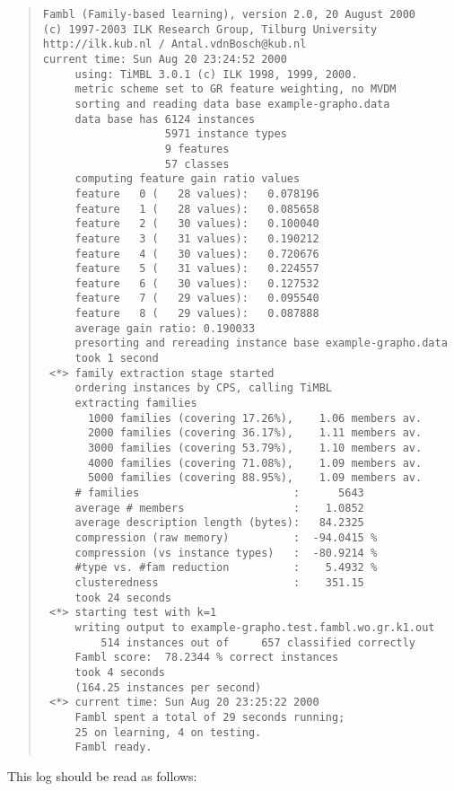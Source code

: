 \documentclass[11pt]{article}
\begin{document}
\begin{quote}
{\tiny
\begin{verbatim}
Fambl (Family-based learning), version 2.0, 20 August 2000
(c) 1997-2003 ILK Research Group, Tilburg University
http://ilk.kub.nl / Antal.vdnBosch@kub.nl
current time: Sun Aug 20 23:24:52 2000
     using: TiMBL 3.0.1 (c) ILK 1998, 1999, 2000.
     metric scheme set to GR feature weighting, no MVDM
     sorting and reading data base example-grapho.data
     data base has 6124 instances
                   5971 instance types
                   9 features
                   57 classes
     computing feature gain ratio values
     feature   0 (   28 values):   0.078196
     feature   1 (   28 values):   0.085658
     feature   2 (   30 values):   0.100040
     feature   3 (   31 values):   0.190212
     feature   4 (   30 values):   0.720676
     feature   5 (   31 values):   0.224557
     feature   6 (   30 values):   0.127532
     feature   7 (   29 values):   0.095540
     feature   8 (   29 values):   0.087888
     average gain ratio: 0.190033
     presorting and rereading instance base example-grapho.data
     took 1 second
 <*> family extraction stage started
     ordering instances by CPS, calling TiMBL
     extracting families
       1000 families (covering 17.26%),    1.06 members av.
       2000 families (covering 36.17%),    1.11 members av.
       3000 families (covering 53.79%),    1.10 members av.
       4000 families (covering 71.08%),    1.09 members av.
       5000 families (covering 88.95%),    1.09 members av.
     # families                        :      5643
     average # members                 :    1.0852
     average description length (bytes):   84.2325
     compression (raw memory)          :  -94.0415 %
     compression (vs instance types)   :  -80.9214 %
     #type vs. #fam reduction          :    5.4932 %
     clusteredness                     :    351.15
     took 24 seconds
 <*> starting test with k=1
     writing output to example-grapho.test.fambl.wo.gr.k1.out
         514 instances out of     657 classified correctly
     Fambl score:  78.2344 % correct instances
     took 4 seconds
     (164.25 instances per second)
 <*> current time: Sun Aug 20 23:25:22 2000
     Fambl spent a total of 29 seconds running;
     25 on learning, 4 on testing.
     Fambl ready.
\end{verbatim}
}
\end{quote}

This log should be read as follows:
\end{document}
